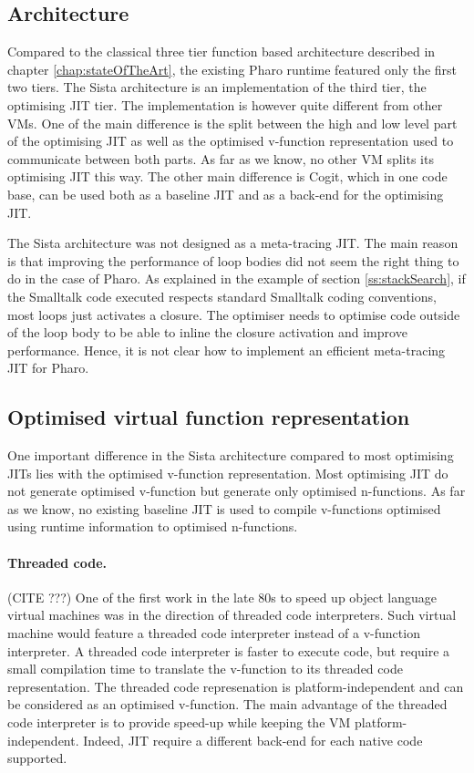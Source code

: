 \documentclass[a4paper,12pt,twoside]{../includes/ThesisStyle}
\begin{document}
\subsection{Architecture}
\label{sec:relWArch}

Compared to the classical three tier function based architecture described in chapter \ref{chap:stateOfTheArt}, the existing Pharo runtime featured only the first two tiers. The Sista architecture is an implementation of the third tier, the optimising JIT tier. The implementation is however quite different from other VMs. One of the main difference is the split between the high and low level part of the optimising JIT as well as the optimised v-function representation used to communicate between both parts. As far as we know, no other VM splits its optimising JIT this way. The other main difference is Cogit, which in one code base, can be used both as a baseline JIT and as a back-end for the optimising JIT.

The Sista architecture was not designed as a meta-tracing JIT. The main reason is that improving the performance of loop bodies did not seem the right thing to do in the case of Pharo. As explained in the example of section \ref{ss:stackSearch}, if the Smalltalk code executed respects standard Smalltalk coding conventions, most loops just activates a closure. The optimiser needs to optimise code outside of the loop body to be able to inline the closure activation and improve performance. Hence, it is not clear how to implement an efficient meta-tracing JIT for Pharo.

\subsection{Optimised virtual function representation}
\label{sec:interface}

One important difference in the Sista architecture compared to most optimising JITs lies with the optimised v-function representation. Most optimising JIT do not generate optimised v-function but generate only optimised n-functions. As far as we know, no existing baseline JIT is used to compile v-functions optimised using runtime information to optimised n-functions.

\paragraph{Threaded code.}
(CITE ???)
One of the first work in the late 80s to speed up object language virtual machines was in the direction of threaded code interpreters. Such virtual machine would feature a threaded code interpreter instead of a v-function interpreter. A threaded code interpreter is faster to execute code, but require a small compilation time to translate the v-function to its threaded code representation. The threaded code represenation is platform-independent and can be considered as an optimised v-function. The main advantage of the threaded code interpreter is to provide speed-up while keeping the VM platform-independent. Indeed, JIT require a different back-end for each native code supported. 
\end{document}
